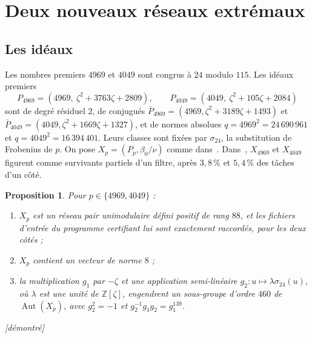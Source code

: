 \documentclass[11pt,a4paper]{amsart}
\theoremstyle{plain}
\newtheorem{proposition}{Proposition}[section]
\theoremstyle{definition}
\newcommand{\Z}{\mathbb{Z}}
\DeclareMathOperator{\Aut}{Aut}
\newcommand{\st}[1]{\textup{\textsf{\small[#1]}}}
\newcommand{\DEM}{\st{démontré}}
\begin{document}
\section{Deux nouveaux réseaux extrémaux}\label{sec:new}

\subsection{Les idéaux}
Les nombres premiers $4969$ et $4049$ sont congrus à $24$ modulo $115$. Les idéaux premiers
\[
P_{4969}=(4969,\ \zeta^2+3763\zeta+2809),\qquad P_{4049}=(4049,\ \zeta^2+105\zeta+2084)
\]
sont de degré résiduel $2$, de conjugués $\bar P_{4969}=(4969,\zeta^2+3189\zeta+1493)$ et $\bar P_{4049}=(4049,\zeta^2+1669\zeta+1327)$, et de normes absolues $q=4969^2=24\,690\,961$ et $q=4049^2=16\,394\,401$. Leurs classes sont fixées par $\sigma_{24}$, la substitution de Frobenius de $p$. On pose $X_p=(P_p,\beta_0/\nu)$ comme dans~\cite[\S6]{Gau26}. Dans~\cite[\S6.3]{Gau26}, $X_{4969}$ et $X_{4049}$ figurent comme survivants partiels d'un filtre, après $3{,}8\,\%$ et $5{,}4\,\%$ des tâches d'un côté.

\begin{proposition}\label{prop:exact}
Pour $p\in\{4969,4049\}$ :
\begin{enumerate}[label=\textup{(\arabic*)}]
\item $X_p$ est un réseau pair unimodulaire défini positif de rang $88$, et les fichiers d'entrée du programme certifiant lui sont exactement raccordés, pour les deux côtés ;
\item $X_p$ contient un vecteur de norme $8$ ;
\item la multiplication $g_1$ par $-\zeta$ et une application semi-linéaire $g_2\colon u\mapsto\lambda\sigma_{24}(u)$, où $\lambda$ est une unité de $\Z[\zeta]$, engendrent un sous-groupe d'ordre $460$ de $\Aut(X_p)$, avec $g_2^2=-1$ et $g_2^{-1}g_1g_2=g_1^{139}$.
\end{enumerate}
\DEM
\end{proposition}
\end{document}
